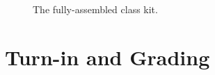     \begin{figure}
        \centering

        \caption{The fully-assembled class kit.\label{fig:complete}}
    \end{figure}

\section*{Turn-in and Grading}

